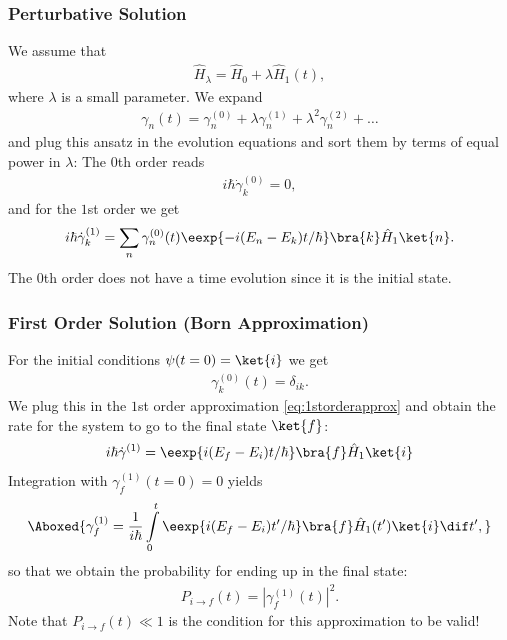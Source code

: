 			\subsubsection{Perturbative Solution}
				We assume that
				\begin{align}
					\hat{H}_\lambda = \hat{H}_0 + \lambda \hat{H}_1(t),
				\end{align}
				where $\lambda$ is a small parameter. We expand
				\begin{align}
					\gamma_n(t) = \gamma_n^{(0)} + \lambda \gamma_n^{(1)} + \lambda^2 \gamma_n^{(2)} + \dots
				\end{align}
				and plug this ansatz in the evolution equations and sort them by terms of equal power in $\lambda$:
				The $0$th order reads
				\begin{align}
					i\hbar \dot{\gamma}_k^{(0)} = 0,
				\end{align}
				and for the $1$st order we get
				\begin{align} \label{eq:1storderapprox}
					i\hbar \dot{\gamma}_k^{(1)} = \sum_n \gamma_n^{(0)}(t) \eexp{-i(E_n-E_k)t/{\hbar}}\bra{k}\hat{H}_1\ket{n}.
				\end{align}
				The $0$th order does not have a time evolution since it is the initial state.

			\subsubsection{First Order Solution (Born Approximation)}
For the initial conditions $\psi(t=0)=\ket{i}$ we get
\begin{align}
\gamma_k^{(0)}(t) = \delta_{ik}.
\end{align}
We plug this in the $1$st order approximation \eqref{eq:1storderapprox} and obtain the rate for the system to go to the final state $\ket{f}$:
%
\begin{align}
i \hbar\dot{\gamma}^{(1)} = \eexp{i(E_f-E_i)t/{\hbar}} \bra{f}\hat{H}_1 \ket{i}
\end{align}
Integration with $\gamma_f^{(1)}(t=0) = 0$ yields
\begin{align}\label{eq:gammaf1}
\Aboxed{\gamma_f^{(1)} = \frac{1}{i\hbar}\int\limits_0^t \eexp{i(E_f-E_i)t'/{\hbar}} \bra{f} \hat{H}_1(t')\ket{i} \dif t',}
\end{align}
so that we obtain the probability for ending up in the final state:
\begin{align}
P_{i\to f}(t) = \left| \gamma_f^{(1)}(t)\right|^2.
\end{align}
Note that  $ P_{i\to f}(t) \ll 1$ is the condition for this approximation to be valid!
